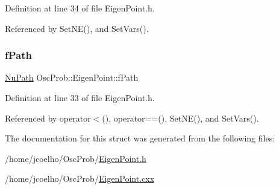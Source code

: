 Definition at line 34 of file Eigen\+Point.\+h.



Referenced by Set\+N\+E(), and Set\+Vars().

\mbox{\label{structOscProb_1_1EigenPoint_a1c263b6ceef5bd4de3181182f944efbb}} 
\subsubsection{\texorpdfstring{f\+Path}{fPath}}
{\footnotesize\ttfamily \hyperlink{structOscProb_1_1NuPath}{Nu\+Path} Osc\+Prob\+::\+Eigen\+Point\+::f\+Path}



Definition at line 33 of file Eigen\+Point.\+h.



Referenced by operator$<$(), operator==(), Set\+N\+E(), and Set\+Vars().



The documentation for this struct was generated from the following files\+:\begin{DoxyCompactItemize}
\item 
/home/jcoelho/\+Osc\+Prob/\hyperlink{EigenPoint_8h}{Eigen\+Point.\+h}\item 
/home/jcoelho/\+Osc\+Prob/\hyperlink{EigenPoint_8cxx}{Eigen\+Point.\+cxx}\end{DoxyCompactItemize}
